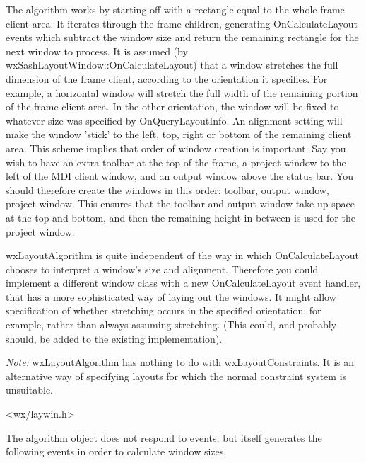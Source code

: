 The algorithm works by starting off with a rectangle equal to the whole frame client area.
It iterates through the frame children, generating OnCalculateLayout events which subtract
the window size and return the remaining rectangle for the next window to process. It
is assumed (by wxSashLayoutWindow::OnCalculateLayout) that a window stretches the full dimension
of the frame client, according to the orientation it specifies. For example, a horizontal window
will stretch the full width of the remaining portion of the frame client area.
In the other orientation, the window will be fixed to whatever size was specified by
OnQueryLayoutInfo. An alignment setting will make the window 'stick' to the left, top, right or
bottom of the remaining client area. This scheme implies that order of window creation is important.
Say you wish to have an extra toolbar at the top of the frame, a project window to the left of
the MDI client window, and an output window above the status bar. You should therefore create
the windows in this order: toolbar, output window, project window. This ensures that the toolbar and
output window take up space at the top and bottom, and then the remaining height in-between is used for
the project window.

wxLayoutAlgorithm is quite independent of the way in which
OnCalculateLayout chooses to interpret a window's size and alignment. Therefore you
could implement a different window class with a new OnCalculateLayout event handler,
that has a more sophisticated way of laying out the windows. It might allow
specification of whether stretching occurs in the specified orientation, for example,
rather than always assuming stretching. (This could, and probably should, be added to the existing
implementation).

{\it Note:} wxLayoutAlgorithm has nothing to do with wxLayoutConstraints. It is an alternative
way of specifying layouts for which the normal constraint system is unsuitable.




<wx/laywin.h>


The algorithm object does not respond to events, but itself generates the
following events in order to calculate window sizes.

\twocolwidtha{7cm}%
\begin{twocollist}\itemsep=0pt
\end{twocollist}

